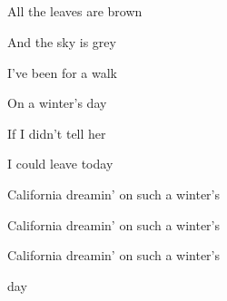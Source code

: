 \begin{song}
\bigskip

   \textbar\    \par
{}    \textbar\   \par
{}    \textbar\   \par
{}    \textbar\   \par

\bigskip

All the leaves are brown   \par
And the sky is grey  \par
I've been for a walk   \par
On a winter's day  \par
If I didn’t tell her   \par
I could leave today  \par

\bigskip

California dreamin’   on such a winter's \par
{} California dreamin’   on such a winter's \par
{} California dreamin’   on such a winter's \par
{} day \par
{} \par

\end{song}
